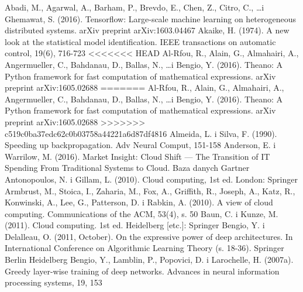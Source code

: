 \documentclass[12pt,a4paper,twoside]{article}
\begin{document}
\clearpage

\begin{thebibliography}{99}
\setlength{\itemsep}{0pt}%
 Abadi, M., Agarwal, A., Barham, P., Brevdo, E., Chen, Z., Citro, C., \ldots i Ghemawat, S. (2016). Tensorflow: Large-scale machine learning on heterogeneous distributed systems. arXiv preprint arXiv:1603.04467
 Akaike, H. (1974). A new look at the statistical model identification. IEEE transactions on automatic control, 19(6), 716-723
<<<<<<< HEAD
 Al-Rfou, R., Alain, G., Almahairi, A., Angermueller, C., Bahdanau, D., Ballas, N., \ldots i Bengio, Y. (2016). Theano: A Python framework for fast computation of mathematical expressions. arXiv preprint arXiv:1605.02688
=======
 Al-Rfou, R., Alain, G., Almahairi, A., Angermueller, C., Bahdanau, D., Ballas, N., \ldots i Bengio, Y. (2016). Theano: A Python framework for fast computation of mathematical expressions. arXiv preprint arXiv:1605.02688
>>>>>>> c519c0ba37edc62c0b03758a44221a6d87df4816
 Almeida, L. i Silva, F. (1990). Speeding up backpropagation. Adv Neural Comput, 151-158
 Anderson, E. i Warrilow, M. (2016). Market Insight: Cloud Shift — The Transition of IT Spending From Traditional Systems to Cloud. Baza danych Gartner
 Antonopoulos, N. i Gillam, L. (2010). Cloud computing, 1st ed. London: Springer
 Armbrust, M., Stoica, I., Zaharia, M., Fox, A., Griffith, R., Joseph, A., Katz, R., Konwinski, A., Lee, G., Patterson, D. i Rabkin, A. (2010). A view of cloud computing. Communications of the ACM, 53(4), s. 50
 Baun, C. i Kunze, M. (2011). Cloud computing. 1st ed. Heidelberg [etc.]: Springer
 Bengio, Y. i Delalleau, O. (2011, October). On the expressive power of deep architectures. In International Conference on Algorithmic Learning Theory (s. 18-36). Springer Berlin Heidelberg
 Bengio, Y., Lamblin, P., Popovici, D. i Larochelle, H. (2007a). Greedy layer-wise training of deep networks. Advances in neural information processing systems, 19, 153

\end{thebibliography}
\end{document}

